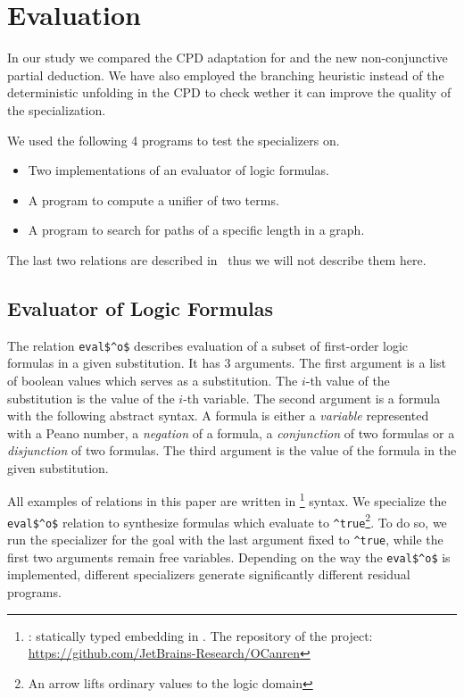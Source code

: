 \section{Evaluation}

In our study we compared the CPD adaptation for \mk{} and the new non-conjunctive partial deduction.
We have also employed the branching heuristic instead of the deterministic unfolding in the CPD to check wether it can improve the quality of the specialization.

We used the following 4 programs to test the specializers on.
\begin{itemize}
  \item Two implementations of an evaluator of logic formulas.
  \item A program to compute a unifier of two terms.
  \item A program to search for paths of a specific length in a graph.
\end{itemize}

The last two relations are described in~\cite{lozov2019relational} thus we will not describe them here.


\subsection{Evaluator of Logic Formulas}

The relation \lstinline{eval$^o$} describes evaluation of a subset of first-order logic formulas in a given substitution.
It has 3 arguments.
The first argument is a list of boolean values which serves as a substitution.
The $i$-th value of the substitution is the value of the $i$-th variable.
The second argument is a formula with the following abstract syntax.
A formula is either a \emph{variable} represented with a Peano number, a \emph{negation} of a formula, a \emph{conjunction} of two formulas or a \emph{disjunction} of two formulas.
The third argument is the value of the formula in the given substitution.

All examples of \mk{} relations in this paper are written in \oc{}\footnote{\oc{}: statically typed \mk{} embedding in \ocaml{}. The repository of the project: \url{https://github.com/JetBrains-Research/OCanren}} syntax.
We specialize the \lstinline{eval$^o$} relation to synthesize formulas which evaluate to \lstinline{^true}\footnote{An arrow lifts ordinary values to the logic domain}.
To do so, we run the specializer for the goal with the last argument fixed to \lstinline{^true}, while the first two arguments remain free variables.
Depending on the way the \lstinline{eval$^o$} is implemented, different specializers generate significantly different residual programs.

